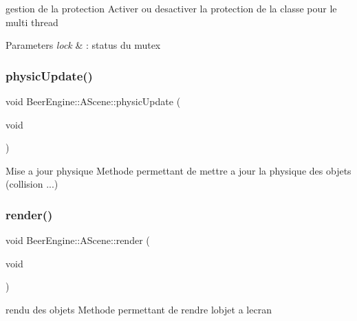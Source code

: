 gestion de la protection Activer ou desactiver la protection de la classe pour le multi thread 


\begin{DoxyParams}{Parameters}
{\em lock} & \+: status du mutex \\
\hline
\end{DoxyParams}
\mbox{\label{class_beer_engine_1_1_a_scene_a1b9cff7ce753a578cdd1b95308a22fec}} 
\subsubsection{\texorpdfstring{physic\+Update()}{physicUpdate()}}
{\footnotesize\ttfamily void Beer\+Engine\+::\+A\+Scene\+::physic\+Update (\begin{DoxyParamCaption}\item[{void}]{ }\end{DoxyParamCaption})}



Mise a jour physique Methode permettant de mettre a jour la physique des objets (collision ...) 

\mbox{\label{class_beer_engine_1_1_a_scene_a445ef1917ea393ebea9be85bf0aa37f1}} 
\subsubsection{\texorpdfstring{render()}{render()}}
{\footnotesize\ttfamily void Beer\+Engine\+::\+A\+Scene\+::render (\begin{DoxyParamCaption}\item[{void}]{ }\end{DoxyParamCaption})}



rendu des objets Methode permettant de rendre l\textquotesingle{}objet a l\textquotesingle{}ecran 

\mbox{\label{class_beer_engine_1_1_a_scene_a93d3ef94fbd5201f10e9185833bc3e0c}} 
